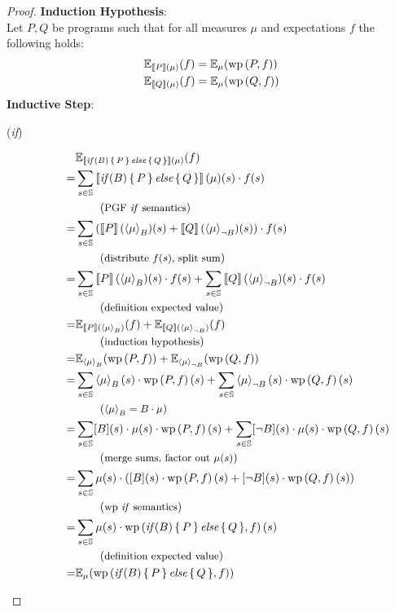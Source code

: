 \begin{theorem}
\begin{proof}
		\textbf{Induction Hypothesis}: \\
		Let $P, Q$ be programs such that for all measures $\mu$ and expectations $f$ the following holds:
		\begin{align*}
			& \E_{\smtx{P}(\mu)} (f) = \E_\mu (\wp{P, f}) \\
			& \E_{\smtx{Q}(\mu)} (f) = \E_\mu (\wp{Q, f})
		\end{align*}
		\textbf{Inductive Step}: \\
		\begin{description}
			\item[(\textit{if})] \begin{align*}
				  & \E_{\smtx{\ifp{B}{P}{Q}}(\mu)} (f) \\
				= & \sum_{s \in \S} \smtx{\ifp{B}{P}{Q}}(\mu)(s) \cdot f(s) \\
				  & \explain{PGF \textit{if} semantics} \\
				= & \sum_{s \in \S} \l( \smtx{P}(\resP{\mu})(s)
					+ \smtx{Q}(\resN{\mu})(s) \r) \cdot f(s) \\
				  & \explain{distribute $f(s)$, split sum} \\
				= & \sum_{s \in \S} \smtx{P}(\resP{\mu})(s) \cdot f(s)
					+ \sum_{s \in \S} \smtx{Q}(\resN{\mu})(s) \cdot f(s) \\
				  & \explain{definition expected value} \\
				= & \E_{\smtx{P}(\resP{\mu})} (f) + \E_{\smtx{Q}(\resN{\mu})} (f) \\
				  & \explain{induction hypothesis} \\
				= & \E_{\resP{\mu}} (\wp{P, f}) + \E_{\resN{\mu}} (\wp{Q, f}) \\
				= & \sum_{s \in \S} \resP{\mu}(s) \cdot \wp{P, f}(s)
					+ \sum_{s \in \S} \resN{\mu}(s) \cdot \wp{Q, f}(s) \\
				  & \explain{$\resP{\mu} = B \cdot \mu$} \\
				= & \sum_{s \in \S} [B](s) \cdot \mu(s) \cdot \wp{P, f}(s)
					+ \sum_{s \in \S} [\lnot B](s) \cdot \mu(s) \cdot \wp{Q, f}(s) \\
				  & \explain{merge sums, factor out $\mu(s)$} \\
				= & \sum_{s \in \S} \mu(s) \cdot \l( [B](s) \cdot \wp{P, f}(s)
					+ [\lnot B](s) \cdot \wp{Q, f}(s) \r) \\
				  & \explain{wp \textit{if} semantics} \\
				= & \sum_{s \in \S} \mu(s) \cdot \wp{\ifp{B}{P}{Q}, f}(s) \\
				  & \explain{definition expected value} \\
				= & \E_\mu ( \wp{\ifp{B}{P}{Q}, f} )
			\end{align*}
			

\end{description}
\end{proof}
\end{theorem}
